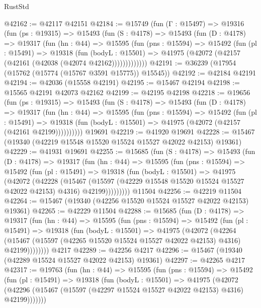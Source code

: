 \begin{lexlean}{RustStd}
\begin{coremodule}
@42162 := @42117 @42151
@42184 := @15749
    (fun (Γ : @15497) =>
    @19316
      (fun (ps : @19315) =>
      @15493
        (fun (S : @4178) =>
        @15493
          (fun (D : @4178) =>
          @19317
            (fun (hn : @44) =>
            @15595
              (fun (pns : @15594) =>
              @15492
                (fun (pl : @15491) =>
                @19318
                  (fun (bodyL : @15501) =>
                  @41975 (@42072 (@42157 (@42161 (@42038 (@42074 @42162)))))))))))))
@42191 := @36239 (@17954 (@15762 (@15774 (@15767 @3591 @15775)) @15545))
@42192 := @42184 @42191
@42194 := @42036 (@15558 @42191)
@42195 := @15467 @42194
@42198 := @15565 @42191 @42073 @42162
@42199 := @42195 @42198
@42218 := @19656
    (fun (ps : @19315) =>
    @15493
      (fun (S : @4178) =>
      @15493
        (fun (D : @4178) =>
        @19317
          (fun (hn : @44) =>
          @15595
            (fun (pns : @15594) =>
            @15492
              (fun (pl : @15491) =>
              @19318 (fun (bodyL : @15501) => @41975 (@42072 (@42157 (@42161 @42199))))))))))
    @19691
@42219 := @41920 @19691
@42228 := @15467 (@19340 (@42219 @15548 @15520 @15524 @15527 @42022 @42153) @19361)
@42229 := @41931 @19691
@42255 := @15685
    (fun (S : @4178) =>
    @15493
      (fun (D : @4178) =>
      @19317
        (fun (hn : @44) =>
        @15595
          (fun (pns : @15594) =>
          @15492
            (fun (pl : @15491) =>
            @19318
              (fun (bodyL : @15501) =>
              @41975
                (@42072
                  (@42228
                    (@15467
                      (@15597 (@42229 @15548 @15520 @15524 @15527 @42022 @42153) @4316)
                      @42199)))))))))
    @11504
@42256 := @42219 @11504
@42264 := @15467 (@19340 (@42256 @15520 @15524 @15527 @42022 @42153) @19361)
@42265 := @42229 @11504
@42288 := @15685
    (fun (D : @4178) =>
    @19317
      (fun (hn : @44) =>
      @15595
        (fun (pns : @15594) =>
        @15492
          (fun (pl : @15491) =>
          @19318
            (fun (bodyL : @15501) =>
            @41975
              (@42072
                (@42264
                  (@15467 (@15597 (@42265 @15520 @15524 @15527 @42022 @42153) @4316) @42199))))))))
    @4217
@42289 := @42256 @4217
@42296 := @15467 (@19340 (@42289 @15524 @15527 @42022 @42153) @19361)
@42297 := @42265 @4217
@42317 := @19763
    (fun (hn : @44) =>
    @15595
      (fun (pns : @15594) =>
      @15492
        (fun (pl : @15491) =>
        @19318
          (fun (bodyL : @15501) =>
          @41975
            (@42072
              (@42296 (@15467 (@15597 (@42297 @15524 @15527 @42022 @42153) @4316) @42199)))))))

\end{coremodule}
\end{lexlean}
